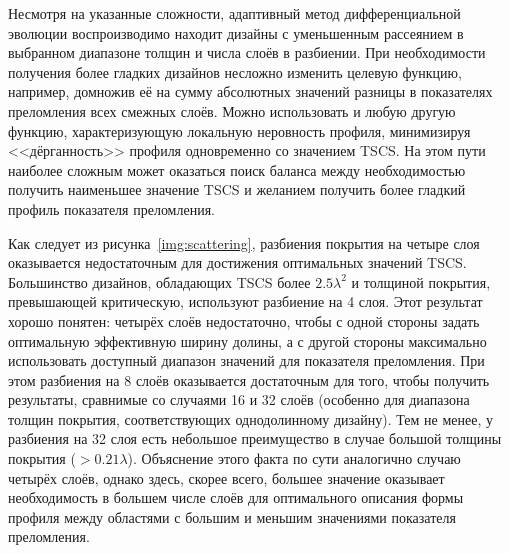 Несмотря на указанные сложности, адаптивный метод дифференциальной
эволюции воспроизводимо находит дизайны с уменьшенным рассеянием в
выбранном диапазоне толщин и числа слоёв в разбиении.  При
необходимости получения более гладких дизайнов несложно изменить
целевую функцию, например, домножив её на сумму абсолютных значений
разницы в показателях преломления всех смежных слоёв.  Можно
использовать и любую другую функцию, характеризующую локальную
неровность профиля, минимизируя <<дёрганность>> профиля одновременно
со значением TSCS.  На этом пути наиболее сложным может оказаться
поиск баланса между необходимостью получить наименьшее значение TSCS и
желанием получить более гладкий профиль показателя преломления.

Как следует из рисунка~\ref{img:scattering}, разбиения покрытия на
четыре слоя оказывается недостаточным для достижения оптимальных
значений TSCS.  Большинство дизайнов, обладающих TSCS более
$2.5\lambda^2$ и толщиной покрытия, превышающей критическую,
используют разбиение на 4 слоя.  Этот результат хорошо понятен:
четырёх слоёв недостаточно, чтобы с одной стороны задать оптимальную
эффективную ширину долины, а с другой стороны максимально использовать
доступный диапазон значений для показателя преломления.  При этом
разбиения на 8 слоёв оказывается достаточным для того, чтобы получить
результаты, сравнимые со случаями 16 и 32 слоёв (особенно для
диапазона толщин покрытия, соответствующих однодолинному дизайну).
Тем не менее, у разбиения на 32 слоя есть небольшое преимущество в
случае большой толщины покрытия (${> 0.21\lambda}$). Объяснение этого
факта по сути аналогично случаю четырёх слоёв, однако здесь, скорее
всего, большее значение оказывает необходимость в большем числе слоёв
для оптимального описания формы профиля между областями с большим и
меньшим значениями показателя преломления.
\begin{figure}
\end{figure}

